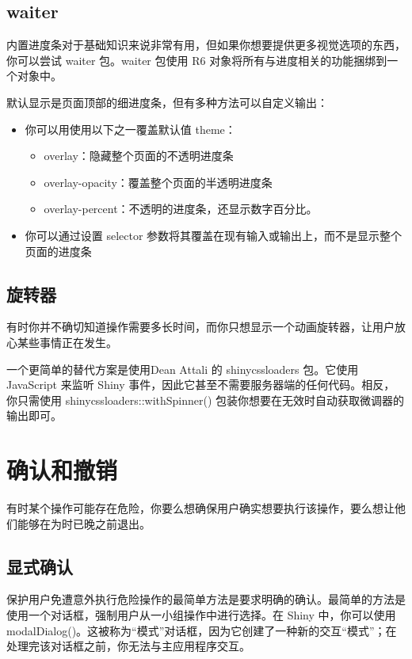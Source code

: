 \subsection{waiter}
内置进度条对于基础知识来说非常有用，但如果你想要提供更多视觉选项的东西，你可以尝试 waiter 包。waiter 包使用 R6 对象将所有与进度相关的功能捆绑到一个对象中。

默认显示是页面顶部的细进度条，但有多种方法可以自定义输出：
\begin{itemize}
    \item 你可以用使用以下之一覆盖默认值 theme：
          \begin{itemize}
              \item overlay：隐藏整个页面的不透明进度条
              \item overlay-opacity：覆盖整个页面的半透明进度条
              \item overlay-percent：不透明的进度条，还显示数字百分比。
          \end{itemize}
    \item 你可以通过设置 selector 参数将其覆盖在现有输入或输出上，而不是显示整个页面的进度条
\end{itemize}

\subsection{旋转器}
有时你并不确切知道操作需要多长时间，而你只想显示一个动画旋转器，让用户放心某些事情正在发生。

一个更简单的替代方案是使用Dean Attali 的 shinycssloaders 包。它使用 JavaScript 来监听 Shiny 事件，因此它甚至不需要服务器端的任何代码。相反，你只需使用 shinycssloaders::withSpinner() 包装你想要在无效时自动获取微调器的输出即可。

\section{确认和撤销}
有时某个操作可能存在危险，你要么想确保用户确实想要执行该操作，要么想让他们能够在为时已晚之前退出。
\subsection{显式确认\label{subsection841}}
保护用户免遭意外执行危险操作的最简单方法是要求明确的确认。最简单的方法是使用一个对话框，强制用户从一小组操作中进行选择。在 Shiny 中，你可以使用 modalDialog()。这被称为“模式”对话框，因为它创建了一种新的交互“模式”；在处理完该对话框之前，你无法与主应用程序交互。

